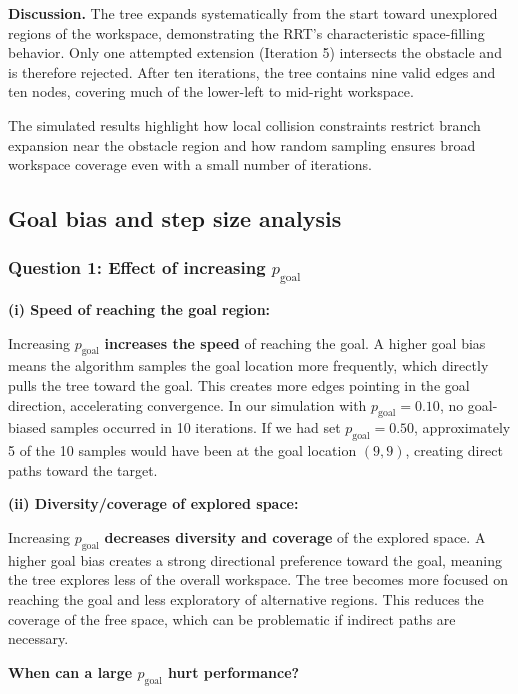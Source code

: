 \documentclass[11pt]{article}
\begin{document}
\textbf{Discussion.}
The tree expands systematically from the start toward unexplored regions of the workspace, demonstrating the RRT’s characteristic space-filling behavior.  
Only one attempted extension (Iteration 5) intersects the obstacle and is therefore rejected. After ten iterations, the tree contains nine valid edges and ten nodes, covering much of the lower-left to mid-right workspace.

The simulated results highlight how local collision constraints restrict branch expansion near the obstacle region and how random sampling ensures broad workspace coverage even with a small number of iterations.


\subsection{Goal bias and step size analysis}

\subsubsection*{Question 1: Effect of increasing $p_{\text{goal}}$}

\textbf{(i) Speed of reaching the goal region:}

Increasing $p_{\text{goal}}$ \textbf{increases the speed} of reaching the goal. A higher goal bias means the algorithm samples the goal location more frequently, which directly pulls the tree toward the goal. This creates more edges pointing in the goal direction, accelerating convergence. In our simulation with $p_{\text{goal}} = 0.10$, no goal-biased samples occurred in 10 iterations. If we had set $p_{\text{goal}} = 0.50$, approximately 5 of the 10 samples would have been at the goal location $(9,9)$, creating direct paths toward the target.

\textbf{(ii) Diversity/coverage of explored space:}

Increasing $p_{\text{goal}}$ \textbf{decreases diversity and coverage} of the explored space. A higher goal bias creates a strong directional preference toward the goal, meaning the tree explores less of the overall workspace. The tree becomes more focused on reaching the goal and less exploratory of alternative regions. This reduces the coverage of the free space, which can be problematic if indirect paths are necessary.

\textbf{When can a large $p_{\text{goal}}$ hurt performance?}
\end{document}
